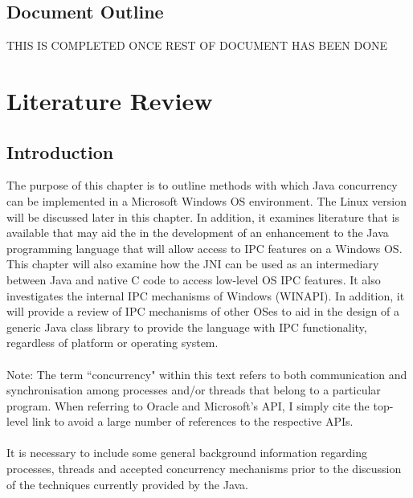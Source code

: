 \documentclass[12pt] {newrucsthesis}    %
\begin{document}
    \section{Document Outline}
      THIS IS COMPLETED ONCE REST OF DOCUMENT HAS BEEN DONE

  \chapter{Literature Review}
    \section{Introduction}
      The purpose of this chapter is to outline methods with which Java concurrency can be implemented in a Microsoft Windows
      OS environment. The Linux version will be discussed later in this chapter. In addition, it examines literature that is available that may aid the in the
      development of an enhancement to the Java programming language that will allow access to IPC features on a
      Windows OS. This chapter will also examine how the JNI can be used as
      an intermediary between Java and native C code to access low-level OS IPC features. It
      also investigates the internal IPC mechanisms of Windows (WINAPI). In addition, it will provide a review of IPC
      mechanisms of other OSes to aid in the design of a generic Java class library to provide the
      language with IPC functionality, regardless of platform or operating system.
      \\\\
      Note: The term ``concurrency" within this text refers to both communication and synchronisation among
      processes and/or threads that belong to a particular program.
      When referring to Oracle and Microsoft's API, I simply cite the top-level link to avoid a
      large number of references to the respective APIs.
      \\\\
      It is necessary to include some general background information regarding processes, threads and accepted
      concurrency mechanisms prior to the discussion of the techniques currently provided by the Java.
\end{document}
